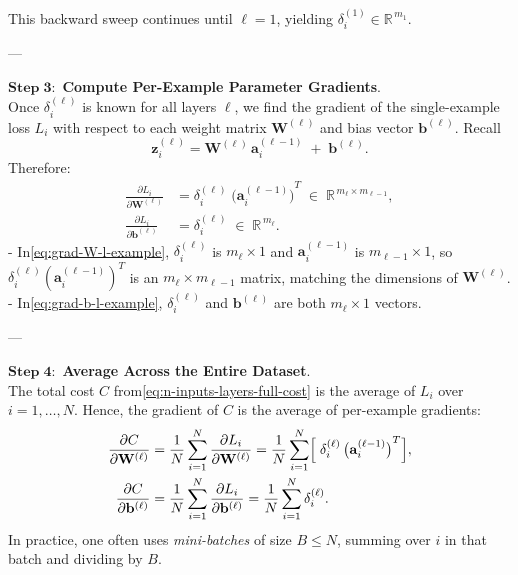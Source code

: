 \documentclass{article}
\begin{document}
\medskip
\noindent This backward sweep continues until \(\ell=1\), yielding \(\delta_{i}^{(1)}\in\mathbb{R}^{\,m_{1}}\).

---

\noindent\(\mathbf{Step\;3:}\) \textbf{Compute Per-Example Parameter Gradients}.\\
Once \(\delta_{i}^{(\ell)}\) is known for all layers \(\ell\), we find the gradient of the single-example loss \(L_{i}\) with respect to each weight matrix \(\mathbf{W}^{(\ell)}\) and bias vector \(\mathbf{b}^{(\ell)}\).  Recall
\[
    \mathbf{z}_{i}^{(\ell)} 
    = \mathbf{W}^{(\ell)}\,\mathbf{a}_{i}^{(\ell-1)} \;+\; \mathbf{b}^{(\ell)}.
\]
Therefore:
\begin{align}
    \frac{\partial L_{i}}{\partial \mathbf{W}^{(\ell)}} 
    &= \delta_{i}^{(\ell)} \;{\bigl(\mathbf{a}_{i}^{(\ell-1)}\bigr)}^{T} 
    \;\in\;\mathbb{R}^{\,m_{\ell}\times m_{\ell-1}},
    \label{eq:grad-W-l-example}
    \\
    \frac{\partial L_{i}}{\partial \mathbf{b}^{(\ell)}} 
    &= \delta_{i}^{(\ell)} 
    \;\in\;\mathbb{R}^{\,m_{\ell}}.
    \label{eq:grad-b-l-example}
\end{align}
- In\eqref{eq:grad-W-l-example}, \(\delta_{i}^{(\ell)}\) is \(m_{\ell}\times 1\) and \(\mathbf{a}_{i}^{(\ell-1)}\) is \(m_{\ell-1}\times 1\), so \(\delta_{i}^{(\ell)}{(\mathbf{a}_{i}^{(\ell-1)})}^{T}\) is an \(m_{\ell}\times m_{\ell-1}\) matrix, matching the dimensions of \(\mathbf{W}^{(\ell)}\).  
- In\eqref{eq:grad-b-l-example}, \(\delta_{i}^{(\ell)}\) and \(\mathbf{b}^{(\ell)}\) are both \(m_{\ell}\times 1\) vectors.

---

\noindent\(\mathbf{Step\;4:}\) \textbf{Average Across the Entire Dataset}.\\
The total cost \(C\) from\eqref{eq:n-inputs-layers-full-cost} is the average of \(L_{i}\) over \(i=1,\dots,N\).  Hence, the gradient of \(C\) is the average of per-example gradients:
\begin{align}
    \frac{\partial C}{\partial \mathbf{W}^{(\ell)}} 
    &= \frac{1}{N}\sum_{i=1}^N 
       \frac{\partial L_{i}}{\partial \mathbf{W}^{(\ell)}}
    = \frac{1}{N}\sum_{i=1}^N 
      \Bigl[\;\delta_{i}^{(\ell)}\,{\bigl(\mathbf{a}_{i}^{(\ell-1)}\bigr)}^{T}\Bigr],
    \label{eq:grad-W-l-full}
    \\
    \frac{\partial C}{\partial \mathbf{b}^{(\ell)}} 
    &= \frac{1}{N}\sum_{i=1}^N 
       \frac{\partial L_{i}}{\partial \mathbf{b}^{(\ell)}}
    = \frac{1}{N}\sum_{i=1}^N \delta_{i}^{(\ell)}.
    \label{eq:grad-b-l-full}
\end{align}
In practice, one often uses \emph{mini-batches} of size \(B\le N\), summing over \(i\) in that batch and dividing by \(B\).
\end{document}

